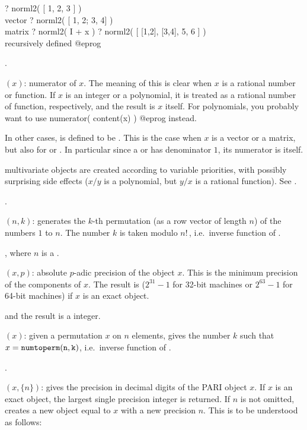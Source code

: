 \bprog
? norml2( [ 1, 2, 3 ] )      \\ vector
? norml2( [ 1, 2; 3, 4] )   \\ matrix
? norml2( I + x )
? norml2( [ [1,2], [3,4], 5, 6 ] )   \\ recursively defined
@eprog

.

$(x)$: numerator of $x$. The meaning of this
is clear when $x$ is a rational number or function. If $x$ is an integer
or a polynomial, it is treated as a rational number of function,
respectively, and the result is $x$ itself. For polynomials, you
probably want to use 
\bprog
    numerator( content(x) )
@eprog\noindent
instead.

In other cases,  is defined to be
. This is the case when $x$ is a vector or a
matrix, but also for  or . In particular since a
 or  has  denominator $1$, its numerator is
itself.

 multivariate objects are created according to variable
priorities, with possibly surprising side effects ($x/y$ is a polynomial, but
$y/x$ is a rational function). See .

.

$(n,k)$: generates the $k$-th permutation (as a
row vector of length $n$) of the numbers $1$ to $n$. The number $k$ is taken
modulo $n!\,$, i.e.~inverse function of .

, where $n$ is a .

$(x,p)$: absolute $p$-adic precision of the object $x$.
This is the minimum precision of the components of $x$. The result is
 ($2^{31}-1$ for 32-bit machines or $2^{63}-1$ for 64-bit
machines) if $x$ is an exact object.

 and the result is a 
integer.

$(x)$: given a permutation $x$ on $n$ elements,
gives the number $k$ such that $x={\tt numtoperm(n,k)}$, i.e.~inverse
function of .

.

$(x,\{n\})$: gives the precision in decimal digits of the
PARI object $x$. If $x$ is an exact object, the largest single precision
integer is returned. If $n$ is not omitted, creates a new object equal to $x$
with a new precision $n$. This is to be understood as follows:

